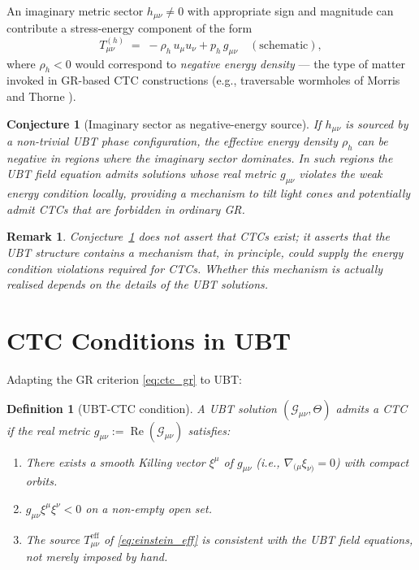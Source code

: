 \documentclass[12pt]{article}
\newtheorem{conjecture}{Conjecture}
\newtheorem{definition}{Definition}
\newtheorem{remark}{Remark}
\begin{document}
An imaginary metric sector $h_{\mu\nu} \neq 0$ with appropriate sign
and magnitude can contribute a stress-energy component of the form
\begin{equation}
  T_{\mu\nu}^{(h)} \;=\; -\rho_h\,u_\mu u_\nu + p_h\,g_{\mu\nu}
  \quad (\text{schematic}),
\end{equation}
where $\rho_h < 0$ would correspond to \emph{negative energy density} —
the type of matter invoked in GR-based CTC constructions (e.g., traversable
wormholes of Morris and Thorne \cite{Morris1988}).

\begin{conjecture}[Imaginary sector as negative-energy source]
\label{conj:neg_energy}
If $h_{\mu\nu}$ is sourced by a non-trivial UBT phase configuration, the
effective energy density $\rho_h$ can be negative in regions where the
imaginary sector dominates.  In such regions the UBT field equation admits
solutions whose real metric $g_{\mu\nu}$ violates the weak energy condition
locally, providing a mechanism to tilt light cones and potentially admit CTCs
that are forbidden in ordinary GR.
\end{conjecture}

\begin{remark}
Conjecture~\ref{conj:neg_energy} does not assert that CTCs \emph{exist};
it asserts that the UBT structure contains a \emph{mechanism} that, in
principle, could supply the energy condition violations required for CTCs.
Whether this mechanism is actually realised depends on the details of the
UBT solutions.
\end{remark}

\section{CTC Conditions in UBT}
Adapting the GR criterion \eqref{eq:ctc_gr} to UBT:

\begin{definition}[UBT-CTC condition]
A UBT solution $(\mathcal{G}_{\mu\nu}, \Theta)$ admits a \emph{CTC} if
the real metric $g_{\mu\nu} := \operatorname{Re}(\mathcal{G}_{\mu\nu})$
satisfies:
\begin{enumerate}
  \item There exists a smooth Killing vector $\xi^\mu$ of $g_{\mu\nu}$
    (i.e., $\nabla_{(\mu}\xi_{\nu)} = 0$) with compact orbits.
  \item $g_{\mu\nu}\xi^\mu\xi^\nu < 0$ on a non-empty open set.
  \item The source $T_{\mu\nu}^{\mathrm{eff}}$ of \eqref{eq:einstein_eff}
    is consistent with the UBT field equations, not merely imposed by hand.
\end{enumerate}
\end{definition}
\end{document}
